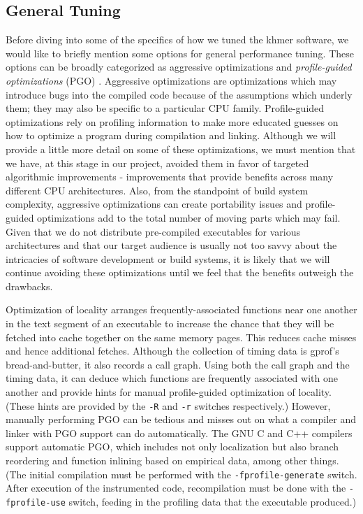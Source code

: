 \subsection{General Tuning}

Before diving into some of the specifics of how we tuned the khmer software, we
would like to briefly mention some options for general performance tuning.
These options can be broadly categorized as aggressive optimizations and
\textit{profile-guided optimizations} (PGO) \citep{web:PGO}. Aggressive
optimizations are optimizations which may introduce bugs into the compiled code
because of the assumptions which underly them; they may also be specific to a
particular CPU family. Profile-guided optimizations rely on profiling
information to make more educated guesses on how to optimize a program during
compilation and linking. Although we will provide a little more detail on some
of these optimizations, we must mention that we have, at this stage in our
project, avoided them in favor of targeted algorithmic improvements -
improvements that provide benefits across many different CPU architectures.
Also, from the standpoint of build system complexity, aggressive optimizations
can create portability issues and profile-guided optimizations add to the total
number of moving parts which may fail. Given that we do not distribute
pre-compiled executables for various architectures and that our target audience
is usually not too savvy about the intricacies of software development or build
systems, it is likely that we will continue avoiding these optimizations until
we feel that the benefits outweigh the drawbacks.

Optimization of locality arranges frequently-associated functions near one
another in the text segment of an executable to increase the chance that they
will be fetched into cache together on the same memory pages. This reduces
cache misses and hence additional fetches. Although the collection of timing
data is gprof's bread-and-butter, it also records a call graph. Using both the
call graph and the timing data, it can deduce which functions are frequently
associated with one another and provide hints for manual profile-guided
optimization of locality. (These hints are provided by the \texttt{-R} and
\texttt{-r} switches respectively.) However, manually performing PGO can be
tedious and misses out on what a compiler and linker with PGO support can do
automatically. The GNU C and C++ compilers support automatic PGO, which
includes not only localization but also branch reordering and function inlining
based on empirical data, among other things. (The initial compilation must be
performed with the \texttt{-fprofile-generate} switch. After execution of the
instrumented code, recompilation must be done with the \texttt{-fprofile-use}
switch, feeding in the profiling data that the executable produced.)

